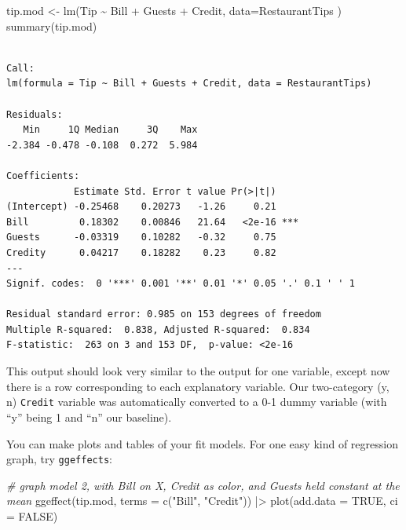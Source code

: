 \documentclass[
  letterpaper,
  DIV=11,
  numbers=noendperiod]{scrreprt}
\newenvironment{Shaded}{\begin{snugshade}}{\end{snugshade}}
\newcommand{\AttributeTok}[1]{\textcolor[rgb]{0.49,0.56,0.16}{#1}}
\newcommand{\CommentTok}[1]{\textcolor[rgb]{0.38,0.63,0.69}{\textit{#1}}}
\newcommand{\ConstantTok}[1]{\textcolor[rgb]{0.53,0.00,0.00}{#1}}
\newcommand{\FunctionTok}[1]{\textcolor[rgb]{0.02,0.16,0.49}{#1}}
\newcommand{\NormalTok}[1]{\textcolor[rgb]{0.00,0.44,0.13}{#1}}
\newcommand{\OtherTok}[1]{\textcolor[rgb]{0.00,0.44,0.13}{#1}}
\newcommand{\SpecialCharTok}[1]{\textcolor[rgb]{0.25,0.44,0.63}{#1}}
\newcommand{\StringTok}[1]{\textcolor[rgb]{0.25,0.44,0.63}{#1}}
\begin{document}
\begin{Shaded}
\begin{Highlighting}[]
\NormalTok{tip.mod }\OtherTok{\textless{}{-}} \FunctionTok{lm}\NormalTok{(Tip }\SpecialCharTok{\textasciitilde{}}\NormalTok{ Bill }\SpecialCharTok{+}\NormalTok{ Guests }\SpecialCharTok{+}\NormalTok{ Credit, }\AttributeTok{data=}\NormalTok{RestaurantTips )}
\FunctionTok{summary}\NormalTok{(tip.mod)}
\end{Highlighting}
\end{Shaded}

\begin{verbatim}

Call:
lm(formula = Tip ~ Bill + Guests + Credit, data = RestaurantTips)

Residuals:
   Min     1Q Median     3Q    Max 
-2.384 -0.478 -0.108  0.272  5.984 

Coefficients:
            Estimate Std. Error t value Pr(>|t|)    
(Intercept) -0.25468    0.20273   -1.26     0.21    
Bill         0.18302    0.00846   21.64   <2e-16 ***
Guests      -0.03319    0.10282   -0.32     0.75    
Credity      0.04217    0.18282    0.23     0.82    
---
Signif. codes:  0 '***' 0.001 '**' 0.01 '*' 0.05 '.' 0.1 ' ' 1

Residual standard error: 0.985 on 153 degrees of freedom
Multiple R-squared:  0.838, Adjusted R-squared:  0.834 
F-statistic:  263 on 3 and 153 DF,  p-value: <2e-16
\end{verbatim}

This output should look very similar to the output for one variable,
except now there is a row corresponding to each explanatory variable.
Our two-category (y, n) \texttt{Credit} variable was automatically
converted to a 0-1 dummy variable (with ``y'' being 1 and ``n'' our
baseline).

You can make plots and tables of your fit models. For one easy kind of
regression graph, try \texttt{ggeffects}:

\begin{Shaded}
\begin{Highlighting}[]
\CommentTok{\# graph model 2, with Bill on X, Credit as color, and Guests held constant at the mean}
\FunctionTok{ggeffect}\NormalTok{(tip.mod, }\AttributeTok{terms =} \FunctionTok{c}\NormalTok{(}\StringTok{"Bill"}\NormalTok{, }\StringTok{"Credit"}\NormalTok{)) }\SpecialCharTok{|\textgreater{}} 
  \FunctionTok{plot}\NormalTok{(}\AttributeTok{add.data =} \ConstantTok{TRUE}\NormalTok{, }\AttributeTok{ci =} \ConstantTok{FALSE}\NormalTok{)}
\end{Highlighting}
\end{Shaded}
\end{document}
